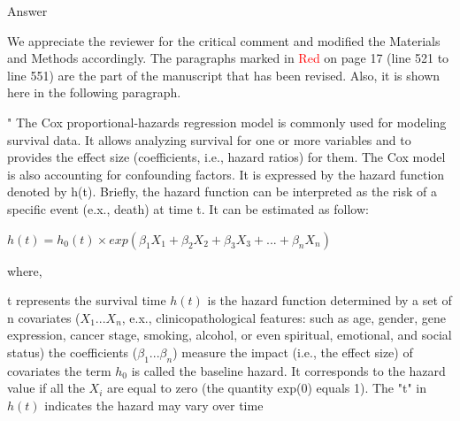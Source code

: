 \documentclass[preprint,12pt]{elsarticle}
\newenvironment{MyIndent}
{\par\leftskip1cm\relax\rightskip1cm\relax}
{\par\leftskip0cm\relax\rightskip0cm\relax}
\newenvironment{MyColorPar}[1]{%
    \leavevmode\color{#1}\ignorespaces%
}{%
}%
\begin{document}
%
\begin{MyColorPar}{blue}
Answer

We appreciate the reviewer for the critical comment and modified the Materials and Methods accordingly.
The paragraphs marked in \textcolor{red}{Red} on page 17 (line 521 to line 551) are the part of the manuscript that has been revised. Also, it is shown here in the following paragraph.
\\[0.3cm]

\begin{MyIndent}
\begin{MyColorPar}{red}
"
The Cox proportional-hazards regression model\cite{Cox1972}\cite{Andersen1982} is commonly used for modeling survival data. It allows analyzing survival for one or more variables and to provides the effect size (coefficients, i.e., hazard ratios) for them\cite{Bradburn2003b}. %
The Cox model is also accounting for confounding factors\cite{Magen2019}.
It is expressed by the hazard function denoted by h(t). Briefly, the hazard function can be interpreted as the risk of a specific event (e.x., death) at time t. It can be estimated as follow:

\begin{flushleft}

$h(t) = h_0(t) \times exp(\beta_1 X_1 + \beta_2 X_2 + \beta_3 X_3 + ... + \beta_n X_n)$\\[0.3cm]
\end{flushleft}
where,\\
\begin{outline} %
\1 t represents the survival time
\1 $h(t)$ is the hazard function determined by a set of n covariates ($X_1...X_n$, e.x., clinicopathological features: such as age, gender, gene expression, cancer stage, smoking, alcohol, or even spiritual, emotional, and social status)
\1 the coefficients ($\beta_1...\beta_n$) measure the impact (i.e., the effect size) of covariates
\1 the term $h_0$ is called the baseline hazard. It corresponds to the hazard value if all the $X_i$ are equal to zero (the quantity exp(0) equals 1). The "t" in $h(t)$ indicates the hazard may vary over time
\end{outline}


\end{MyColorPar}
\end{MyIndent}
\end{MyColorPar}
\end{document}

